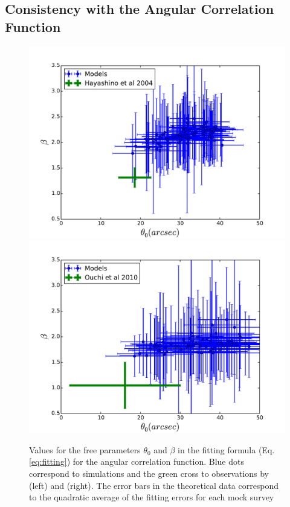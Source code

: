 \documentclass[usenatbib]{mn2e}
\begin{document}
{\subsection{Consistency with the Angular Correlation Function}



\begin{figure}
\begin{center}
\includegraphics[width=0.46\linewidth,angle=0]{power_law_correlation_maxden.pdf} 
\hspace{5mm}  
\includegraphics[width=0.46\linewidth,angle=0]{power_law_correlation_meanden.pdf} 
\end{center}
\caption{Values for the free parameters $\theta_{0}$ and $\beta$
in the fitting formula (Eq. \ref{eq:fitting}) for the angular
correlation function. Blue dots correspond to simulations and the
green cross to observations by \citet{Hayashino2004} (left) and
\citet{Ouchi2010} (right). The error bars in the theoretical data correspond
to the quadratic average of the fitting errors for each mock survey
\label{fig:correlation_parameters}}
\end{figure} 


}
\end{document}
